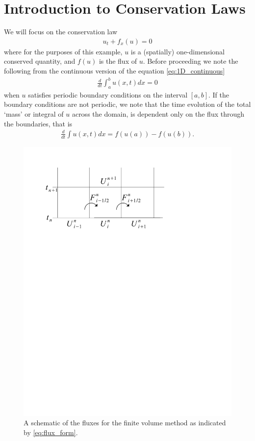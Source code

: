 \label{lab:finitevolume}

\section*{Introduction to Conservation Laws}
We will focus on the conservation law
\begin{gather}\label{eq:1D_continuous}
u_t + f_x(u) = 0
\end{gather}
where for the purposes of this example, $u$ is a (spatially) one-dimensional conserved quantity, and $f(u)$ is the flux of $u$.  Before proceeding we note the following from the continuous version of the equation \eqref{eq:1D_continuous}
\begin{align*}
\frac{d}{dt}\int_a^b u(x,t) dx = 0
\end{align*}
when $u$ satisfies periodic boundary conditions on the interval $[a,b]$.  If the boundary conditions are not periodic, we note that the time evolution of the total `mass' or integral of $u$ across the domain, is dependent only on the flux through the boundaries, that is
\begin{align*}
\frac{d}{dt}\int u(x,t) dx = f(u(a))-f(u(b)).
\end{align*}

\begin{figure}[ht]
\centering
\includegraphics[trim= 20mm 195mm 0mm 30mm, clip]{flux_form.pdf}
\caption{A schematic of the fluxes for the finite volume method as indicated by \eqref{eq:flux_form}.}
\end{figure}

